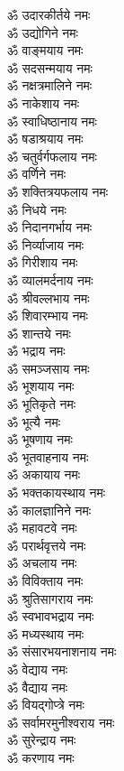 \begin{multicols}{2}
\begin{flushleft}
ॐ उदारकीर्तये नमः\hfill{}\\
ॐ उद्योगिने नमः\\
ॐ वाङ्मयाय नमः\\
ॐ सदसन्मयाय नमः\\
ॐ नक्षत्रमालिने नमः\\
ॐ नाकेशाय नमः\\
ॐ स्वाधिष्ठानाय नमः\\
ॐ षडाश्रयाय नमः\\
ॐ चतुर्वर्गफलाय नमः\\
ॐ वर्णिने नमः\\
ॐ शक्तित्रयफलाय नमः\hfill{}\\
ॐ निधये नमः\\
ॐ निदानगर्भाय नमः\\
ॐ निर्व्याजाय नमः\\
ॐ गिरीशाय नमः\\
ॐ व्यालमर्दनाय नमः\\
ॐ श्रीवल्लभाय नमः\\
ॐ शिवारम्भाय नमः\\
ॐ शान्तये नमः\\
ॐ भद्राय नमः\\
ॐ समञ्जसाय नमः\hfill{}\\
ॐ भूशयाय नमः\\
ॐ भूतिकृते नमः\\
ॐ भूत्यै नमः\\
ॐ भूषणाय नमः\\
ॐ भूतवाहनाय नमः\\
ॐ अकायाय नमः\\
ॐ भक्तकायस्थाय नमः\\
ॐ कालज्ञानिने नमः\\
ॐ महावटवे नमः\\
ॐ परार्थवृत्तये नमः\hfill{}\\
ॐ अचलाय नमः\\
ॐ विविक्ताय नमः\\
ॐ श्रुतिसागराय नमः\\
ॐ स्वभावभद्राय नमः\\
ॐ मध्यस्थाय नमः\\
ॐ संसारभयनाशनाय नमः\\
ॐ वेद्याय नमः\\
ॐ वैद्याय नमः\\
ॐ वियद्गोप्त्रे नमः\\
ॐ सर्वामरमुनीश्वराय नमः\hfill{}\\
ॐ सुरेन्द्राय नमः\\
ॐ करणाय नमः\\

\end{flushleft}
\end{multicols}

